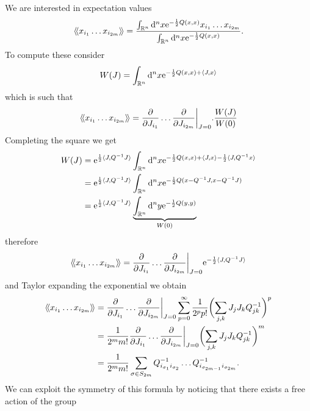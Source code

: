 We are interested in expectation values
\begin{equation*}
  \langle \! \langle {x_{i_1} \dots x_{i_{2m}}} \rangle \! \rangle
  = \frac{
    \int_{\mathbb{R}^n} \mathrm{d}^n x \mathrm{e}^{-\frac{1}{2}Q(x, x)} x_{i_1} \dots x_{i_{2m}}
  }{
    \int_{\mathbb{R}^n} \mathrm{d}^n x \mathrm{e}^{-\frac{1}{2}Q(x, x)}
  }.
\end{equation*}
To compute these consider
\begin{equation*}
  W(J) = \int_{\mathbb{R}^n} \mathrm{d}^n x \mathrm{e}^{-\frac{1}{2} Q(x, x) + \langle J, x \rangle}
\end{equation*}
which is such that
\begin{equation*}
  \langle \! \langle {x_{i_1} \dots x_{i_{2m}}} \rangle \! \rangle
  = \frac{\partial}{\partial J_{i_1}} \dots \frac{\partial}{\partial J_{i_{2m}}} \bigg|_{J = 0}.
  \frac{W(J)}{W(0)}
\end{equation*}
Completing the square we get
\begin{align*}
  W(J) 
  &= \mathrm{e}^{\frac{1}{2} \langle J, Q^{-1} J \rangle}
  \int_{\mathbb{R}^n} \mathrm{d}^n x
  \mathrm{e}^{-\frac{1}{2} Q(x, x) + \langle J, x \rangle - \frac{1}{2} \langle J, Q^{-1} x \rangle} \\
  &= \mathrm{e}^{\frac{1}{2} \langle J, Q^{-1} J \rangle}
  \int_{\mathbb{R}^n} \mathrm{d}^n x
  \mathrm{e}^{- \frac{1}{2} Q (x - Q^{-1} J, x - Q^{-1} J) } \\
  &= \mathrm{e}^{\frac{1}{2} \langle J, Q^{-1} J \rangle}
  \underbrace{\int_{\mathbb{R}^n} \mathrm{d}^n y \mathrm{e}^{- \frac{1}{2} Q (y, y) }}_{W(0)}
\end{align*}
therefore
 \begin{equation*}
  \langle \! \langle {x_{i_1} \dots x_{i_{2m}}} \rangle \! \rangle
  = \frac{\partial}{\partial J_{i_1}} \dots \frac{\partial}{\partial J_{i_{2m}}} \bigg|_{J = 0}
  \mathrm{e}^{-\frac{1}{2} \langle J, Q^{-1} J \rangle}
\end{equation*}
and Taylor expanding the exponential we obtain
\begin{align*}
  \langle \! \langle {x_{i_1} \dots x_{i_{2m}}} \rangle \! \rangle
  &= \frac{\partial}{\partial J_{i_1}} \dots \frac{\partial}{\partial J_{i_{2m}}} \bigg|_{J = 0}
  \sum_{p = 0}^\infty \frac{1}{2^p p!}
  \biggl( \sum_{j, k} J_j J_k Q_{jk}^{-1} \biggr)^p \\
  &= \frac{1}{2^m m!} \frac{\partial}{\partial J_{i_1}} \dots \frac{\partial}{\partial J_{i_{2m}}} \bigg|_{J = 0}
  \biggl( \sum_{j, k} J_j J_k Q_{jk}^{-1} \biggr)^m \\
  &= \frac{1}{2^m m!} \sum_{\sigma \in S_{2m}} Q_{i_{\sigma_1} i_{\sigma_2}}^{-1} \dots
  Q_{i_{\sigma_{2m-1}} i_{\sigma_{2m}}}^{-1}.
\end{align*}
We can exploit the symmetry of this formula by noticing that there exists a free action of the group
